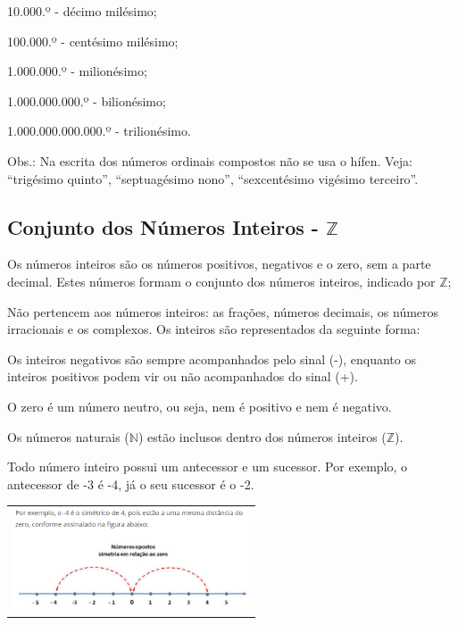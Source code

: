 \begin{multicols*}{2}
\begin{enumerate}
10.000.º - décimo milésimo;

100.000.º - centésimo milésimo;

1.000.000.º - milionésimo;

1.000.000.000.º - bilionésimo;

1.000.000.000.000.º - trilionésimo.

Obs.: Na escrita dos números ordinais compostos não se usa o hífen. Veja: “trigésimo quinto”, “septuagésimo nono”, “sexcentésimo vigésimo terceiro”.

			\end{enumerate}
				
			\subsection{Conjunto dos Números Inteiros - $\mathbb{Z}$}
		
		Os números inteiros são os números positivos, negativos e o zero, sem a parte decimal. Estes números formam o conjunto dos números inteiros, indicado por $\mathbb{Z}$;
		
		Não pertencem aos números inteiros: as frações, números decimais, os números irracionais e os complexos. Os inteiros são representados da seguinte forma:
		
		
		Os inteiros negativos são sempre acompanhados pelo sinal (-), enquanto os inteiros positivos podem vir ou não acompanhados do sinal (+).

	O zero é um número neutro, ou seja, nem é positivo e nem é negativo.

	Os números naturais ($\mathbb{N}$) estão inclusos dentro dos números inteiros ($\mathbb{Z}$).

	Todo número inteiro possui um antecessor e um sucessor. Por exemplo, o antecessor de -3 é -4, já o seu sucessor é o -2.\\
	
    \begin{tabular}{@{}c@{}}
        \includegraphics[height=30mm]{assets/Reta Conjunto dos Inteiros.png}
    \end{tabular}
    

\end{multicols*}
